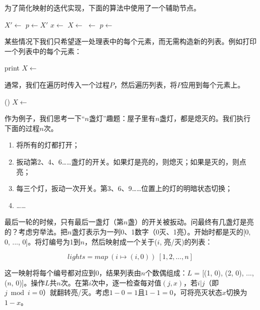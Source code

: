 \documentclass[b5paper]{ctexart}
\begin{document}
为了简化映射的迭代实现，下面的算法中使用了一个辅助节点。

\begin{algorithmic}[1]
  \State $X' \gets$  
  \State $p \gets X'$
    \State $x \gets$ 
    \State $X \gets$ 
    \State {} $\gets$ 
    \State $p \gets$ 
  \EndWhile
  \State \Return {} 
\EndFunction
\end{algorithmic}

某些情况下我们只希望逐一处理表中的每个元素，而无需构造新的列表。例如打印一个列表中的每个元素：

\begin{algorithmic}[1]
    \State print 
    \State $X \gets$ 
  \EndWhile
\EndFunction
\end{algorithmic}

通常，我们在遍历时传入一个过程$P$，然后遍历列表，将$P$应用到每个元素上。

\begin{algorithmic}[1]
    \State {}()
    \State $X \gets$ 
  \EndWhile
\EndFunction
\end{algorithmic}

作为例子，我们思考一下“$n$盏灯”趣题\cite{poj-drunk-jailer}：屋子里有$n$盏灯，都是熄灭的。我们执行下面的过程$n$次。

\begin{enumerate}
\item 将所有的灯都打开；
\item 扳动第2、4、6……盏灯的开关。如果灯是亮的，则熄灭；如果是灭的，则点亮；
\item 每三个灯，扳动一次开关。第3、6、9……位置上的灯的明暗状态切换；
\item ……
\end{enumerate}

最后一轮的时候，只有最后一盏灯（第$n$盏）的开关被扳动。问最终有几盏灯是亮的？考虑穷举法。把$n$盏灯表示为一列0、1数字（0灭、1亮）。开始时都是灭的[0, 0, ..., 0]。将灯编号为1到$n$，然后映射成一个关于($i$, 亮/灭)的列表：

\[
lights = map\ (i \mapsto (i, 0))\ [1, 2, ..., n]
\]

这一映射将每个编号都对应到0，结果列表由$n$个数偶组成：$L$ = [(1, 0), (2, 0), ..., ($n$, 0)]。操作$L$共$n$次。在第$i$次中，逐一检查每对值$(j, x)$，若$i | j$（即$j \bmod i = 0$）就翻转亮/灭。考虑$1 - 0 = 1$且$1 - 1 = 0$，可将亮灭状态$x$切换为$1 - x$。
\end{document}
